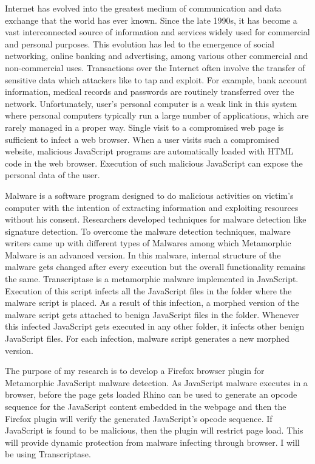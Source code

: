 Internet has evolved into the greatest medium of communication and data exchange that the world has ever known. Since the late 1990s, it has become a vast interconnected source of information and services widely used for commercial and personal purposes. This evolution has led to the emergence of social networking, online banking and advertising, among various other commercial and non-commercial uses. Transactions over the Internet often involve the transfer of sensitive data which attackers like to tap and exploit. For example, bank account information, medical records and passwords are routinely transferred over the network. Unfortunately, user's personal computer is a weak link in this system where personal computers typically run a large number of applications, which are rarely managed in a proper way. Single visit to a compromised web page is sufficient to infect a web browser. When a user visits such a compromised website, malicious JavaScript programs are automatically loaded with HTML code in the web browser. Execution of such malicious JavaScript can expose the personal data of the user. 

Malware is a software program designed to do malicious activities on victim's computer with the intention of extracting information and exploiting resources without his consent. Researchers developed techniques for malware detection like signature detection. To overcome the malware detection techniques, malware writers came up with different types of Malwares among which Metamorphic Malware is an advanced version. In this malware, internal structure of the malware gets changed after every execution but the overall functionality remains the same. Transcriptase is a metamorphic malware implemented in JavaScript. Execution of this script infects all the JavaScript files in the folder where the malware script is placed. As a result of this infection, a morphed version of the malware script gets attached to benign JavaScript files in the folder. Whenever this infected JavaScript gets executed in any other folder, it infects other benign JavaScript files. For each infection, malware script generates a new morphed version.

The purpose of my research is to develop a Firefox browser plugin for Metamorphic JavaScript malware detection. As JavaScript malware executes in a browser, before the page gets loaded Rhino can be used to generate an opcode sequence for the JavaScript content embedded in the webpage and then the Firefox plugin will verify the generated JavaScript's opcode sequence. If JavaScript is found to be malicious, then the plugin will restrict page load. This will provide dynamic protection from malware infecting through browser. I will be using Transcriptase.


